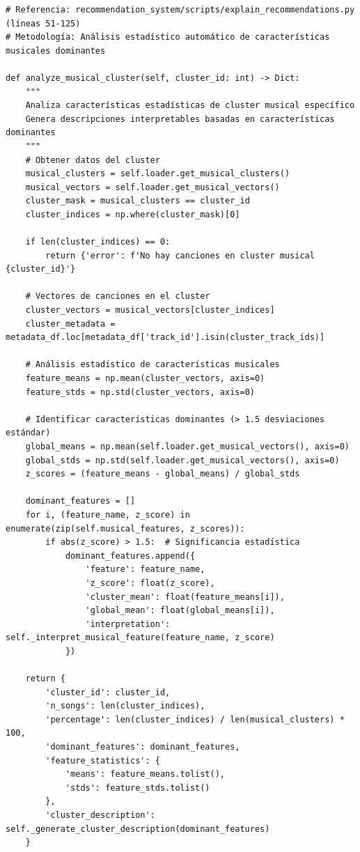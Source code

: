 \documentclass[12pt,a4paper]{article}
\begin{document}
\begin{lstlisting}[caption={Análisis Estadístico Automático de Clusters Musicales}]
# Referencia: recommendation_system/scripts/explain_recommendations.py (líneas 51-125)
# Metodología: Análisis estadístico automático de características musicales dominantes

def analyze_musical_cluster(self, cluster_id: int) -> Dict:
    """
    Analiza características estadísticas de cluster musical específico
    Genera descripciones interpretables basadas en características dominantes
    """
    # Obtener datos del cluster
    musical_clusters = self.loader.get_musical_clusters()
    musical_vectors = self.loader.get_musical_vectors()
    cluster_mask = musical_clusters == cluster_id
    cluster_indices = np.where(cluster_mask)[0]

    if len(cluster_indices) == 0:
        return {'error': f'No hay canciones en cluster musical {cluster_id}'}

    # Vectores de canciones en el cluster
    cluster_vectors = musical_vectors[cluster_indices]
    cluster_metadata = metadata_df.loc[metadata_df['track_id'].isin(cluster_track_ids)]

    # Análisis estadístico de características musicales
    feature_means = np.mean(cluster_vectors, axis=0)
    feature_stds = np.std(cluster_vectors, axis=0)

    # Identificar características dominantes (> 1.5 desviaciones estándar)
    global_means = np.mean(self.loader.get_musical_vectors(), axis=0)
    global_stds = np.std(self.loader.get_musical_vectors(), axis=0)
    z_scores = (feature_means - global_means) / global_stds

    dominant_features = []
    for i, (feature_name, z_score) in enumerate(zip(self.musical_features, z_scores)):
        if abs(z_score) > 1.5:  # Significancia estadística
            dominant_features.append({
                'feature': feature_name,
                'z_score': float(z_score),
                'cluster_mean': float(feature_means[i]),
                'global_mean': float(global_means[i]),
                'interpretation': self._interpret_musical_feature(feature_name, z_score)
            })

    return {
        'cluster_id': cluster_id,
        'n_songs': len(cluster_indices),
        'percentage': len(cluster_indices) / len(musical_clusters) * 100,
        'dominant_features': dominant_features,
        'feature_statistics': {
            'means': feature_means.tolist(),
            'stds': feature_stds.tolist()
        },
        'cluster_description': self._generate_cluster_description(dominant_features)
    }
\end{lstlisting}
\end{document}
